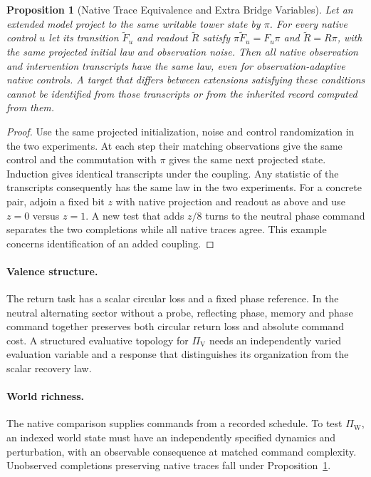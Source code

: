 \documentclass[11pt,a4paper]{article}
\newtheorem{proposition}[theorem]{Proposition}
\theoremstyle{definition}
\newcommand{\PiV}{\Pi_{\mathrm{V}}}
\newcommand{\PiW}{\Pi_{\mathrm{W}}}
\begin{document}
\begin{proposition}[Native Trace Equivalence and Extra Bridge Variables]\label{prop:bridge-native-trace-obstruction}
Let an extended model project to the same writable tower state by $\pi$. For every native control $u$ let its transition $\widetilde F_u$ and readout $\widetilde R$ satisfy $\pi\widetilde F_u=F_u\pi$ and $\widetilde R=R\pi$, with the same projected initial law and observation noise. Then all native observation and intervention transcripts have the same law, even for observation-adaptive native controls. A target that differs between extensions satisfying these conditions cannot be identified from those transcripts or from the inherited record computed from them.
\end{proposition}
\begin{proof}
Use the same projected initialization, noise and control randomization in the two experiments. At each step their matching observations give the same control and the commutation with $\pi$ gives the same next projected state. Induction gives identical transcripts under the coupling. Any statistic of the transcripts consequently has the same law in the two experiments. For a concrete pair, adjoin a fixed bit $z$ with native projection and readout as above and use $z=0$ versus $z=1$. A new test that adds $z/8$ turns to the neutral phase command separates the two completions while all native traces agree. This example concerns identification of an added coupling.
\end{proof}

\paragraph{Valence structure.}
The return task has a scalar circular loss and a fixed phase reference. In the neutral alternating sector without a probe, reflecting phase, memory and phase command together preserves both circular return loss and absolute command cost. A structured evaluative topology for $\PiV$ needs an independently varied evaluation variable and a response that distinguishes its organization from the scalar recovery law.

\paragraph{World richness.}
The native comparison supplies commands from a recorded schedule. To test $\PiW$, an indexed world state must have an independently specified dynamics and perturbation, with an observable consequence at matched command complexity. Unobserved completions preserving native traces fall under Proposition~\ref{prop:bridge-native-trace-obstruction}.
\end{document}
